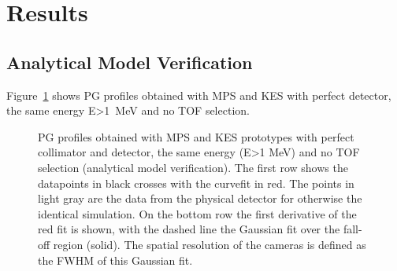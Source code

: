 \documentclass[a4paper,english,12pt]{article}
\begin{document}
\section{Results}

\subsection{Analytical Model Verification}

Figure~\ref{fig:PGprofileFairComp} shows PG profiles obtained with MPS and KES with perfect detector, the same energy E>1~MeV and no TOF selection.

\begin{figure}[!htp]
  \centering
  \quad
  \caption{\label{fig:PGprofileFairComp} PG profiles obtained with MPS and KES prototypes with perfect collimator and detector, the same energy (E>1 MeV) and no TOF selection (analytical model verification). The first row shows the datapoints in black crosses with the curvefit in red. The points in light gray are the data from the physical detector for otherwise the identical simulation. On the bottom row the first derivative of the red fit is shown, with the dashed line the Gaussian fit over the fall-off region (solid). The spatial resolution of the cameras is defined as the FWHM of this Gaussian fit.}
\end{figure}  

\end{document}
